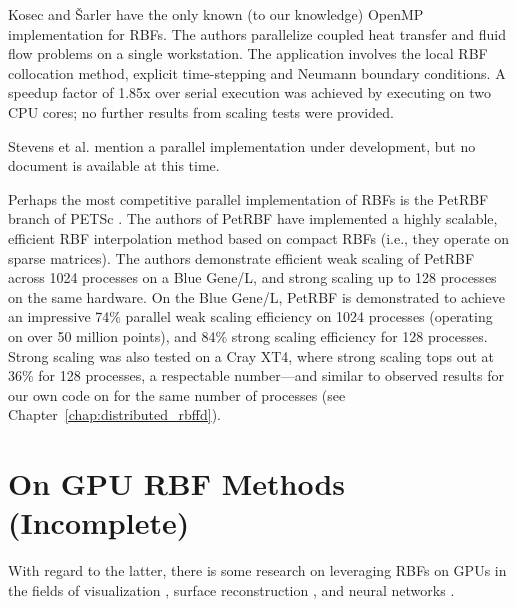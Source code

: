 \documentclass[11pt]{report}
\begin{document}
Kosec and \v{S}arler \cite{Kosec2008} have the only known (to our knowledge) OpenMP implementation for RBFs. The authors parallelize coupled heat transfer 
and fluid flow problems on a single workstation. 
The application involves the local RBF collocation method, explicit time-stepping and Neumann boundary conditions. A speedup 
factor of 1.85x over serial execution was achieved by executing on two CPU cores; no further 
results from scaling tests were provided. 

Stevens et al. \cite{Stevens2009a} mention a parallel implementation under development, but no document is available at this time. 

Perhaps the most competitive parallel implementation of RBFs is the PetRBF branch of PETSc \cite{Yokota2010}. The authors of PetRBF have implemented a highly scalable, efficient RBF interpolation method based on compact RBFs (i.e., they operate on sparse matrices). The authors demonstrate efficient weak scaling of PetRBF across 1024 processes on a Blue Gene/L, and strong scaling up to 128 processes on the same hardware. On the Blue Gene/L, PetRBF is demonstrated to achieve an impressive 74\% parallel weak scaling efficiency on 1024 processes (operating on over 50 million points), and 84\% strong scaling efficiency for 128 processes. Strong scaling was also tested on a Cray XT4, where strong scaling tops out at 36\% for 128 processes, a respectable number---and similar to observed results for our own code on for the same number of processes (see Chapter~\ref{chap:distributed_rbffd}).  





\section{On GPU RBF Methods (Incomplete)}

With regard to the latter, there is some research on leveraging RBFs on GPUs in the fields of visualization \cite{Cuntz2007,Weiler2005},  surface reconstruction \cite{Corrigan2005,Carr2003}, and neural networks \cite{Brandstetter2008}.
\end{document}
